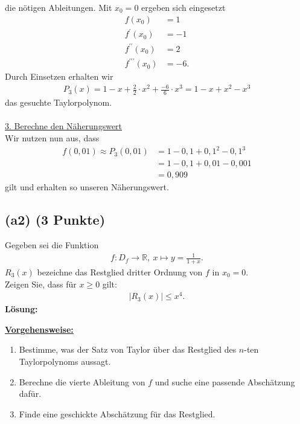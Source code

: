 die nötigen Ableitungen. Mit $x_0=0$ ergeben sich eingesetzt 
\begin{align*}
f(x_0) &= 1\\
f^\prime(x_0) &=-1\\
f^{\prime \prime}(x_0) &= 2 \\
f^{\prime \prime \prime}(x_0) &= -6.
\end{align*}
Durch Einsetzen erhalten wir
\begin{align*}
P_3(x) = 1 - x +\frac{2}{2} \cdot x^2 + \frac{-6}{6} \cdot	x^3
=1 -x +x^2 -x^3 
\end{align*}
das gesuchte Taylorpolynom.
\\
\\
\underline{3. Berechne den Näherungswert}\\
Wir nutzen nun aus, dass
\begin{align*}
f(0,01) \approx P_3(0,01) 
&= 1 - 0,1+0,1^2-0,1^3\\ 
&=1 -0,1 +0,01-0,001\\
&= 0,909
\end{align*}
gilt und erhalten so unseren Näherungswert.

\newpage 

\subsection*{(a2) (3 Punkte)}
Gegeben sei die Funktion
\begin{align*}
f: D_f \to \mathbb{R}, \ x \mapsto y= \frac{1}{1+x}.
\end{align*}
$R_3(x)$ bezeichne das Restglied dritter Ordnung von $f$ in $x_0=0$.\\
Zeigen Sie, dass für $x \geq 0 $ gilt:
\begin{align*}
|R_3(x)| \leq x^4.
\end{align*}
\textbf{Lösung:}
\begin{mdframed}
\underline{\textbf{Vorgehensweise:}}
\begin{enumerate}
\item Bestimme, was der Satz von Taylor über das Restglied des $n$-ten Taylorpolynoms aussagt. 
\item Berechne die vierte Ableitung von $f$ und suche eine passende Abschätzung dafür.
\item Finde eine geschickte Abschätzung für das Restglied. 
\end{enumerate}
\end{mdframed}

